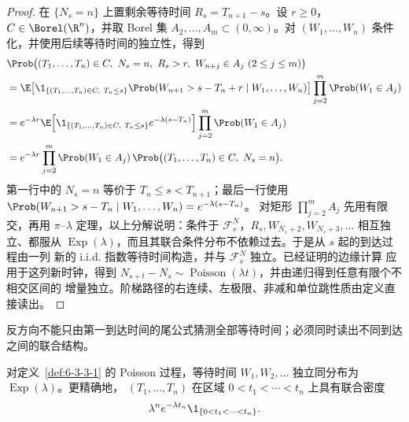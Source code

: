 \begin{proof}
在 $\{N_s=n\}$ 上置剩余等待时间 $R_s=T_{n+1}-s$。设 $r\ge0$，
$C\in\Borel(\R^n)$，并取 Borel 集 $A_2,\ldots,A_m\subset(0,\infty)$。对
$(W_1,\ldots,W_n)$ 条件化，并使用后续等待时间的独立性，得到
\begin{align*}
&\Prob\bigl((T_1,\ldots,T_n)\in C,\ N_s=n,\ R_s>r,
             \ W_{n+j}\in A_j\ (2\le j\le m)\bigr)\\
&=\E\!\left[
 \1_{\{(T_1,\ldots,T_n)\in C,\ T_n\le s\}}
 \Prob(W_{n+1}>s-T_n+r\mid W_1,\ldots,W_n)
 \right]
 \prod_{j=2}^m\Prob(W_1\in A_j)\\
&=e^{-\lambda r}
 \E\!\left[
 \1_{\{(T_1,\ldots,T_n)\in C,\ T_n\le s\}}
 e^{-\lambda(s-T_n)}\right]
 \prod_{j=2}^m\Prob(W_1\in A_j)\\
&=e^{-\lambda r}\prod_{j=2}^m\Prob(W_1\in A_j)\,
 \Prob\bigl((T_1,\ldots,T_n)\in C,\ N_s=n\bigr).
\end{align*}
第一行中的 $N_s=n$ 等价于 $T_n\le s<T_{n+1}$；最后一行使用
$\Prob(W_{n+1}>s-T_n\mid W_1,\ldots,W_n)=e^{-\lambda(s-T_n)}$。
对矩形 $\prod_{j=2}^mA_j$ 先用有限交，再用 $\pi$--$\lambda$ 定理，以上分解说明：条件于
$\mathcal F_s^N$，$R_s,W_{N_s+2},W_{N_s+3},\ldots$ 相互独立、都服从
$\operatorname{Exp}(\lambda)$，而且其联合条件分布不依赖过去。于是从 $s$ 起的到达过程由一列
新的 i.i.d. 指数等待时间构造，并与 $\mathcal F_s^N$ 独立。已经证明的边缘计算
应用于这列新时钟，得到
$N_{s+t}-N_s\sim\operatorname{Poisson}(\lambda t)$，并由递归得到任意有限个不相交区间的
增量独立。阶梯路径的右连续、左极限、非减和单位跳性质由定义直接读出。
\end{proof}

反方向不能只由第一到达时间的尾公式猜测全部等待时间；必须同时读出不同到达之间的联合结构。

\begin{proposition}\label{proposition:6-3-3-arrivals}
对定义~\ref{def:6-3-3-1} 的 Poisson 过程，等待时间
$W_1,W_2,\ldots$ 独立同分布为 $\operatorname{Exp}(\lambda)$。更精确地，
$(T_1,\ldots,T_n)$ 在区域 $0<t_1<\cdots<t_n$ 上具有联合密度
\begin{equation}\label{eq:6-3-3-arrival-joint-density}
 \lambda^ne^{-\lambda t_n}\1_{\{0<t_1<\cdots<t_n\}}.
\end{equation}
\end{proposition}

